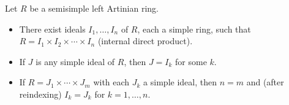 Let $R$ be a semisimple left Artinian ring.
\begin{itemize}
\item[(i)] There exist ideals $I_1, \ldots, I_n$ of $R$, each a simple ring, such that $R = I_1 \times I_2 \times \cdots \times I_n$ (internal direct product).
\item[(ii)] If $J$ is any simple ideal of $R$, then $J = I_k$ for some $k$.
\item[(iii)] If $R = J_1 \times \cdots \times J_m$ with each $J_k$ a simple ideal, then $n = m$ and (after reindexing) $I_k = J_k$ for $k = 1, \ldots, n$.
\end{itemize}
